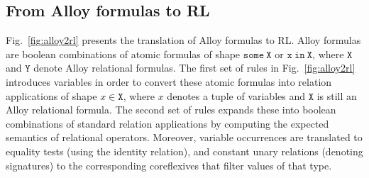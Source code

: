 \documentclass{llncs}
\begin{document}
\subsection{From Alloy formulas to RL}
\label{sec:tralloy}

Fig.~\ref{fig:alloy2rl} presents the translation of Alloy formulas to
RL. Alloy formulas are boolean combinations of atomic formulas of
shape $\mathtt{some\ X}$ or $\mathtt{x\ \texttt{in}\ X}$, where
$\mathtt{X}$ and $\mathtt{Y}$ denote Alloy relational formulas. The
first set of rules in Fig.~\ref{fig:alloy2rl} introduces variables in
order to convert these atomic formulas into relation applications of
shape $x \in \mathtt{X}$, where $x$ denotes a tuple of variables and
$\mathtt{X}$ is still an Alloy relational formula. The second set of
rules expands these into boolean combinations of standard relation
applications by computing the expected semantics of relational
operators. Moreover, variable occurrences are translated to equality
tests (using the identity relation), and constant unary relations
(denoting signatures) to the corresponding coreflexives that filter
values of that type.
\end{document}
